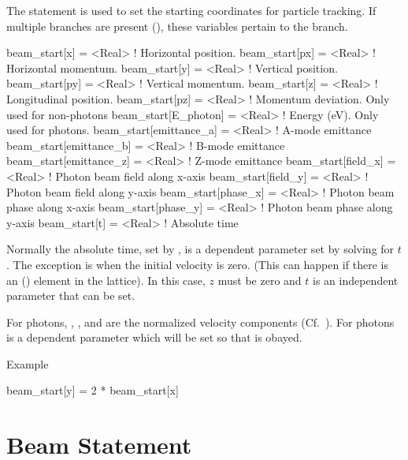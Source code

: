 The  statement is used to set the starting coordinates
for particle tracking. If multiple branches are present
(), these variables pertain to the 
branch.
\begin{example}
  beam_start[x]           = <Real>   ! Horizontal position.
  beam_start[px]          = <Real>   ! Horizontal momentum.
  beam_start[y]           = <Real>   ! Vertical position.
  beam_start[py]          = <Real>   ! Vertical momentum.
  beam_start[z]           = <Real>   ! Longitudinal position.
  beam_start[pz]          = <Real>   ! Momentum deviation. Only used for non-photons
  beam_start[E_photon]    = <Real>   ! Energy (eV). Only used for photons.
  beam_start[emittance_a] = <Real>   ! A-mode emittance
  beam_start[emittance_b] = <Real>   ! B-mode emittance
  beam_start[emittance_z] = <Real>   ! Z-mode emittance
  beam_start[field_x]     = <Real>   ! Photon beam field along x-axis
  beam_start[field_y]     = <Real>   ! Photon beam field along y-axis
  beam_start[phase_x]     = <Real>   ! Photon beam phase along x-axis
  beam_start[phase_y]     = <Real>   ! Photon beam phase along y-axis
  beam_start[t]           = <Real>   ! Absolute time
\end{example}
Normally the absolute time, set by , is a dependent
parameter set by solving  for $t$. The exception is when the
initial velocity is zero. (This can happen if there is an 
() element in the lattice). In this case, $z$ must be
zero and $t$ is an independent parameter that can be set.

For photons, , , and  are the normalized velocity components
(Cf.~). For photons  is a dependent parameter which will be set
so that  is obayed.

Example
\begin{example}
  beam_start[y] = 2 * beam_start[x]
\end{example}

\section{Beam Statement}


